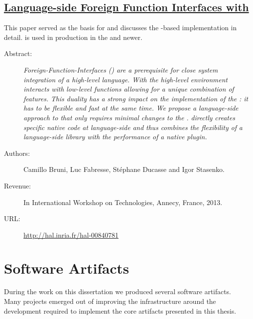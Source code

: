 \subsection*{\href{http://hal.inria.fr/hal-00840781}{Language-side Foreign Function Interfaces with \NB}}

This paper served as the basis for  and discusses the \B-based \FFI implementation \NB in detail.
\NB is used in production in the  and newer.

\begin{description}
	\item[Abstract:] \emph{
		Foreign-Function-Interfaces (\FFIs) are a prerequisite for close system integration of a high-level language.
		With \FFIs the high-level environment interacts with low-level functions allowing for a unique combination of features.
		This duality has a strong impact on the implementation of the \FFI: it has to be flexible and fast at the same time.
		We propose \NB a language-side approach to \FFIs that only requires minimal changes to the \VM.
		\NB directly creates specific native code at language-side and thus combines the flexibility of a language-side library with the performance of a native plugin.}

	\item[Authors:] Camillo Bruni, Luc Fabresse, Stéphane Ducasse and Igor Stasenko. 
	\item[Revenue:] In International Workshop on \ST Technologies, Annecy, France, 2013.
	\item[URL:] \url{http://hal.inria.fr/hal-00840781}
\end{description}



\section{Software Artifacts}
During the work on this dissertation we produced several software artifacts.
Many projects emerged out of improving the infrastructure around the \PH development required to implement the core artifacts presented in this thesis.

